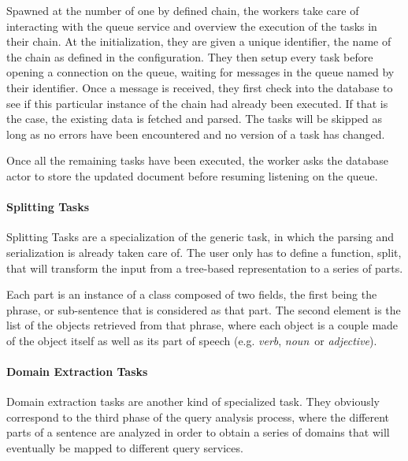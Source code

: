 Spawned at the number of one by defined chain, the workers take care of interacting with the queue service and overview the execution of the tasks in their chain. At the initialization, they are given a unique identifier, the name of the chain as defined in the configuration. They then setup every task before opening a connection on the queue, waiting for messages in the queue named by their identifier. Once a message is received, they first check into the database to see if this particular instance of the chain had already been executed. If that is the case, the existing data is fetched and parsed. The tasks will be skipped as long as no errors have been encountered and no version of a task has changed.

Once all the remaining tasks have been executed, the worker asks the database actor to store the updated document before resuming listening on the queue.


\paragraph{Splitting Tasks} %
\label{par:splitting_tasks}

Splitting Tasks are a specialization of the generic task, in which the parsing and serialization is already taken care of. The user only has to define a function, split, that will transform the input from a tree-based representation to a series of parts.

Each part is an instance of a class composed of two fields, the first being the phrase, or sub-sentence that is considered as that part. The second element is the list of the objects retrieved from that phrase, where each object is a couple made of the object itself as well as its part of speech (e.g. \emph{verb}, \emph{noun}\ or \emph{adjective}).


\paragraph{Domain Extraction Tasks} %
\label{par:domain_extraction_tasks}

Domain extraction tasks are another kind of specialized task. They obviously correspond to the third phase of the query analysis process, where the different parts of a sentence are analyzed in order to obtain a series of domains that will eventually be mapped to different query services.

